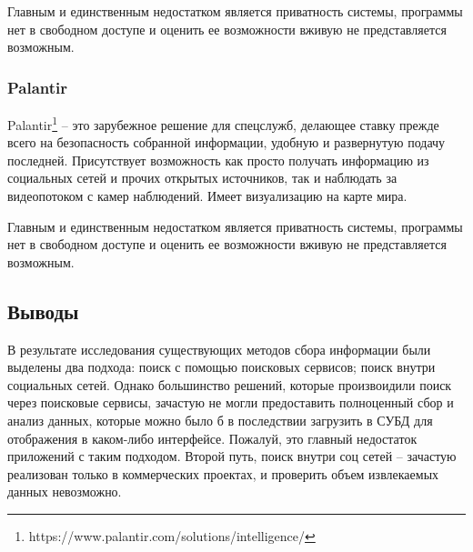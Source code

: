 \par
Главным и единственным недостатком является приватность системы, программы нет в свободном доступе и оценить ее возможности
вживую не представляется возможным.

\subsubsection{Palantir}
Palantir\footnote{https://www.palantir.com/solutions/intelligence/} -- это зарубежное решение для спецслужб, делающее ставку 
прежде всего на безопасность собранной информации, удобную и развернутую подачу последней. Присутствует возможность как просто
получать информацию из социальных сетей и прочих открытых источников, так и наблюдать за видеопотоком с камер наблюдений. Имеет
визуализацию на карте мира.


\par
Главным и единственным недостатком является приватность системы, программы нет в свободном доступе и оценить ее возможности
вживую не представляется возможным.

\subsection{Выводы}
В результате исследования существующих методов сбора информации были выделены два подхода: поиск с помощью поисковых сервисов;
поиск внутри социальных сетей. Однако большинство решений, которые произвоидили поиск через поисковые сервисы, зачастую не могли
предоставить полноценный сбор и анализ данных, которые можно было б в последствии загрузить в СУБД для отображения в каком-либо
интерфейсе. Пожалуй, это главный недостаток приложений с таким подходом. Второй путь, поиск внутри соц сетей -- зачастую реализован
только в коммерческих проектах, и проверить объем извлекаемых данных невозможно.